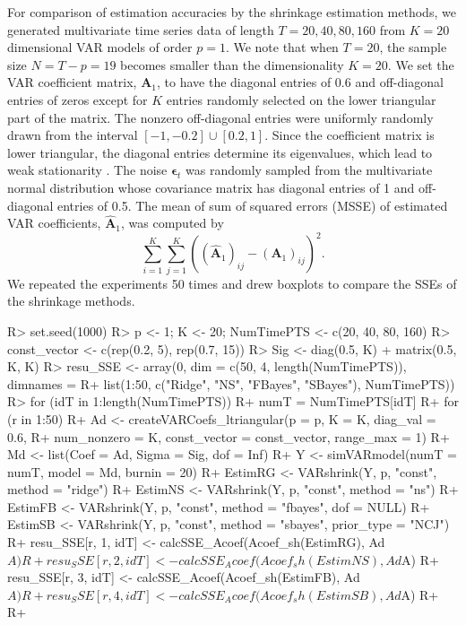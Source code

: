 \documentclass[
]{jss}
\begin{document}
For comparison of estimation accuracies by the shrinkage estimation
methods, we generated multivariate time series data of length
\(T = 20, 40, 80, 160\) from \(K = 20\) dimensional VAR models of order
\(p = 1\). We note that when \(T = 20\), the sample size
\(N = T - p = 19\) becomes smaller than the dimensionality \(K = 20\).
We set the VAR coefficient matrix, \(\mathbf{A}_1\), to have the
diagonal entries of 0.6 and off-diagonal entries of zeros except for
\(K\) entries randomly selected on the lower triangular part of the
matrix. The nonzero off-diagonal entries were uniformly randomly drawn
from the interval \([-1, -0.2]\cup[0.2, 1]\). Since the coefficient
matrix is lower triangular, the diagonal entries determine its
eigenvalues, which lead to weak stationarity \citep{Hamilton94, Tsay05}.
The noise \(\boldsymbol\epsilon_t\) was randomly sampled from the
multivariate normal distribution whose covariance matrix has diagonal
entries of 1 and off-diagonal entries of 0.5. The mean of sum of squared
errors (MSSE) of estimated VAR coefficients, \(\widehat{\mathbf{A}}_1\),
was computed by \begin{equation}
    \sum_{i=1}^K \sum_{j=1}^K \left( \left(\widehat{\mathbf{A}}_1\right)_{ij} -
    \left(\mathbf{A}_1\right)_{ij}  \right)^2.
    \end{equation} We repeated the experiments 50 times and drew
boxplots to compare the SSEs of the shrinkage methods.

\begin{CodeChunk}

\begin{CodeInput}
R> set.seed(1000)
R> p <- 1; K <- 20; NumTimePTS <- c(20, 40, 80, 160)
R> const_vector <- c(rep(0.2, 5), rep(0.7, 15))
R> Sig <- diag(0.5, K) + matrix(0.5, K, K)
R> resu_SSE <- array(0, dim = c(50, 4, length(NumTimePTS)), dimnames =
R+   list(1:50, c("Ridge", "NS", "FBayes", "SBayes"), NumTimePTS))
R> for (idT in 1:length(NumTimePTS)) {
R+   numT = NumTimePTS[idT]
R+   for (r in 1:50) {
R+     Ad <- createVARCoefs_ltriangular(p = p, K = K, diag_val = 0.6,
R+             num_nonzero = K, const_vector = const_vector, range_max = 1)
R+     Md <- list(Coef = Ad, Sigma = Sig, dof = Inf)
R+     Y <- simVARmodel(numT = numT, model = Md, burnin = 20)
R+     EstimRG <- VARshrink(Y, p, "const", method = "ridge")
R+     EstimNS <- VARshrink(Y, p, "const", method = "ns")
R+     EstimFB <- VARshrink(Y, p, "const", method = "fbayes", dof = NULL)
R+     EstimSB <- VARshrink(Y, p, "const", method = "sbayes", prior_type = "NCJ")
R+     resu_SSE[r, 1, idT] <- calcSSE_Acoef(Acoef_sh(EstimRG), Ad$A)
R+     resu_SSE[r, 2, idT] <- calcSSE_Acoef(Acoef_sh(EstimNS), Ad$A)
R+     resu_SSE[r, 3, idT] <- calcSSE_Acoef(Acoef_sh(EstimFB), Ad$A)
R+     resu_SSE[r, 4, idT] <- calcSSE_Acoef(Acoef_sh(EstimSB), Ad$A)
R+   }
R+ }
\end{CodeInput}
\end{CodeChunk}
\end{document}
